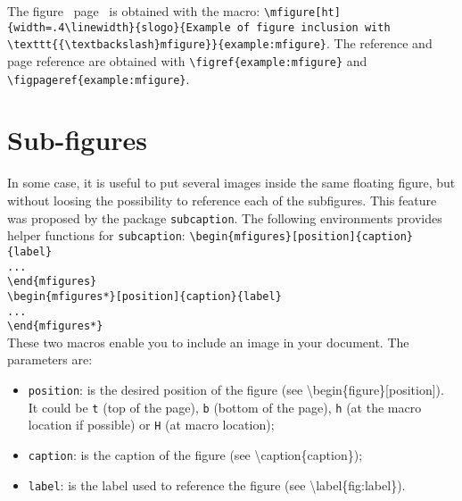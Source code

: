 \documentclass[book]{upmethodology-document}
\begin{document}
The figure~ page~ is obtained with the macro: \texttt{{\textbackslash}mfigure[ht]\{width=.4{\textbackslash}linewidth\}\{slogo\}\{Example of figure inclusion with {\textbackslash}texttt\{\{{\textbackslash}textbackslash\}mfigure\}\}\{example:mfigure\}}. The reference and page reference are obtained with \texttt{{\textbackslash}figref\{example:mfigure\}} and \texttt{{\textbackslash}figpageref\{example:mfigure\}}.


\section{Sub-figures}

In some case, it is useful to put several images inside the same floating figure, but without loosing the possibility to reference each of the subfigures. This feature was proposed by the package \texttt{subcaption}. The following environments provides helper functions for \texttt{subcaption}:
\texttt{{\textbackslash}begin\{mfigures\}[position]\{caption\}\{label\}\\
...\\
{\textbackslash}end\{mfigures\}} \\
\texttt{{\textbackslash}begin\{mfigures*\}[position]\{caption\}\{label\}\\
...\\
{\textbackslash}end\{mfigures*\}} \\

These two macros enable you to include an image in your document. The parameters are:
\begin{itemize}
\item \texttt{position}: is the desired position of the figure (see {\textbackslash}begin\{figure\}[position]). It could be \texttt{t} (top of the page), \texttt{b} (bottom of the page), \texttt{h} (at the macro location if possible) or \texttt{H} (at macro location);

\item \texttt{caption}: is the caption of the figure (see {\textbackslash}caption\{caption\});

\item \texttt{label}: is the label used to reference the figure (see {\textbackslash}label\{fig:label\}).
\end{itemize}
\end{document}

